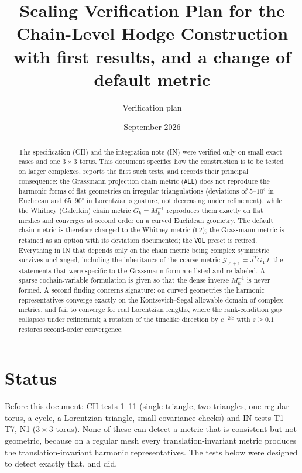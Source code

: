 \documentclass[11pt]{article}
\title{Scaling Verification Plan for the Chain-Level Hodge Construction\\[4pt]\large with first results, and a change of default metric}
\author{Verification plan}
\date{September 2026}
\theoremstyle{definition}
\theoremstyle{plain}
\theoremstyle{remark}
\newcommand{\Tr}{^{T}}
\newcommand{\ttt}[1]{\texttt{#1}}
\begin{document}
\maketitle

\begin{abstract}
The specification (CH) and the integration note (IN) were verified only on small exact cases and one \(3\times3\) torus. This document specifies how the construction is to be tested on larger complexes, reports the first such tests, and records their principal consequence: the Grassmann projection chain metric (\ttt{ALL}) does not reproduce the harmonic forms of flat geometries on irregular triangulations (deviations of \(5\)--\(10^{\circ}\) in Euclidean and \(65\)--\(90^{\circ}\) in Lorentzian signature, not decreasing under refinement), while the Whitney (Galerkin) chain metric \(G_k=M_k^{-1}\) reproduces them exactly on flat meshes and converges at second order on a curved Euclidean geometry. The default chain metric is therefore changed to the Whitney metric (\ttt{L2}); the Grassmann metric is retained as an option with its deviation documented; the \ttt{VOL} preset is retired. Everything in IN that depends only on the chain metric being complex symmetric survives unchanged, including the inheritance of the coarse metric \(\mathcal G_{\ell+1}=J\Tr G_1J\); the statements that were specific to the Grassmann form are listed and re-labeled. A sparse cochain-variable formulation is given so that the dense inverse \(M_k^{-1}\) is never formed. A second finding concerns signature: on curved geometries the harmonic representatives converge exactly on the Kontsevich--Segal allowable domain of complex metrics, and fail to converge for real Lorentzian lengths, where the rank-condition gap collapses under refinement; a rotation of the timelike direction by \(e^{-2i\varepsilon}\) with \(\varepsilon\ge0.1\) restores second-order convergence.
\end{abstract}

\tableofcontents

\section{Status}

Before this document: CH tests 1--11 (single triangle, two triangles, one regular torus, a cycle, a Lorentzian triangle, small covariance checks) and IN tests T1--T7, N1 (\(3\times3\) torus). None of these can detect a metric that is consistent but not geometric, because on a regular mesh every translation-invariant metric produces the translation-invariant harmonic representatives. The tests below were designed to detect exactly that, and did.
\end{document}
